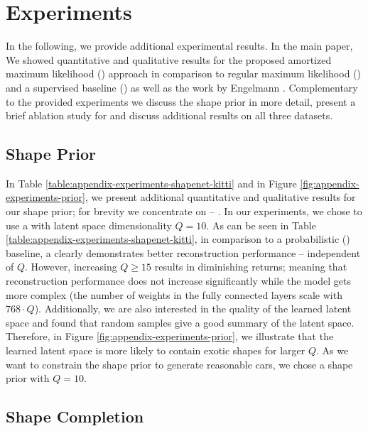 \documentclass[10pt,letterpaper]{article}
\begin{document}
\section{Experiments}
\label{sec:appendix-experiments}

In the following, we provide additional experimental results. In the main paper, We showed quantitative and qualitative results for the proposed amortized maximum likelihood (\AML) approach in comparison to regular maximum likelihood (\ML) and a supervised baseline (\Sup) as well as the work by Engelmann \etal \cite{Engelmann2016GCPR}. Complementary to the provided experiments we discuss the shape prior in more detail, present a brief ablation study for \AML and discuss additional results on all three datasets.

\subsection{Shape Prior}
\label{subsec:appendix-experiments-prior}

In Table \ref{table:appendix-experiments-shapenet-kitti} and in Figure \ref{fig:appendix-experiments-prior}, we present additional quantitative and qualitative results for our shape prior; for brevity we concentrate on \clean -- . In our experiments, we chose to use a \VAE with latent space dimensionality $Q = 10$. As can be seen in Table \ref{table:appendix-experiments-shapenet-kitti}, in comparison to a probabilistic \PCA (\PPCA) baseline, a \VAE clearly demonstrates better reconstruction performance -- independent of $Q$. However, increasing $Q\geq15$ results in diminishing returns; meaning that reconstruction performance does not increase significantly while the model gets more complex (the number of weights in the fully connected layers scale with $768\cdot Q$). Additionally, we are also interested in the quality of the learned latent space and found that random samples give a good summary of the latent space. Therefore, in Figure \ref{fig:appendix-experiments-prior}, we illustrate that the learned latent space is more likely to contain exotic shapes for larger $Q$. As we want to constrain the shape prior to generate reasonable cars, we chose a \VAE shape prior with $Q = 10$.

\subsection{Shape Completion}
\label{subsec:appendix-experiments-inference}
\end{document}
